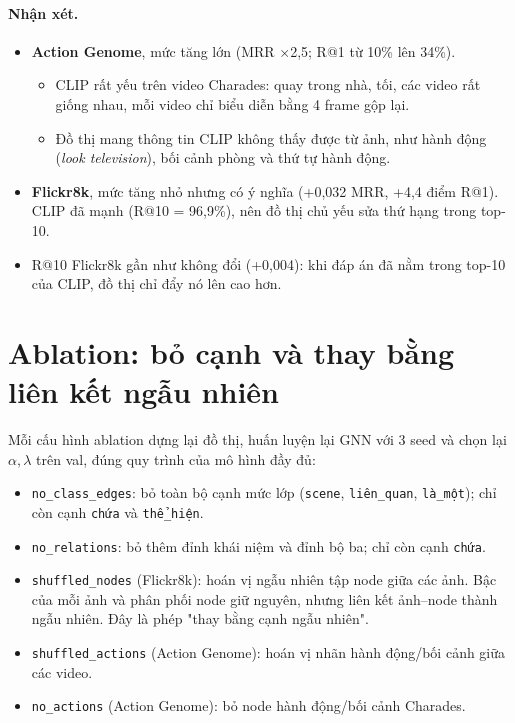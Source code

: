 \documentclass[11pt,a4paper]{article}
\begin{document}
\paragraph{Nhận xét.}
\begin{itemize}
  \item \textbf{Action Genome}, mức tăng lớn (MRR ×2,5; R@1 từ 10\% lên 34\%).
  \begin{itemize}
    \item CLIP rất yếu trên video Charades: quay trong nhà, tối, các video rất giống nhau, mỗi video chỉ biểu diễn bằng 4 frame gộp lại.
    \item Đồ thị mang thông tin CLIP không thấy được từ ảnh, như hành động (\textit{look television}), bối cảnh phòng và thứ tự hành động.
  \end{itemize}
  \item \textbf{Flickr8k}, mức tăng nhỏ nhưng có ý nghĩa (+0,032 MRR, +4,4 điểm R@1). CLIP đã mạnh (R@10 = 96,9\%), nên đồ thị chủ yếu sửa thứ hạng trong top-10.
  \item R@10 Flickr8k gần như không đổi (+0,004): khi đáp án đã nằm trong top-10 của CLIP, đồ thị chỉ đẩy nó lên cao hơn.
\end{itemize}

\section{Ablation: bỏ cạnh và thay bằng liên kết ngẫu nhiên}\label{sec:ablation}

Mỗi cấu hình ablation dựng lại đồ thị, huấn luyện lại GNN với 3 seed và chọn lại \(\alpha,\lambda\) trên val, đúng quy trình của mô hình đầy đủ:
\begin{itemize}
  \item \texttt{no\_class\_edges}: bỏ toàn bộ cạnh mức lớp (\texttt{scene}, \texttt{liên\_quan}, \texttt{là\_một}); chỉ còn cạnh \texttt{chứa} và \texttt{thể\_hiện}.
  \item \texttt{no\_relations}: bỏ thêm đỉnh khái niệm và đỉnh bộ ba; chỉ còn cạnh \texttt{chứa}.
  \item \texttt{shuffled\_nodes} (Flickr8k): hoán vị ngẫu nhiên tập node giữa các ảnh. Bậc của mỗi ảnh và phân phối node giữ nguyên, nhưng liên kết ảnh–node thành ngẫu nhiên. Đây là phép "thay bằng cạnh ngẫu nhiên".
  \item \texttt{shuffled\_actions} (Action Genome): hoán vị nhãn hành động/bối cảnh giữa các video.
  \item \texttt{no\_actions} (Action Genome): bỏ node hành động/bối cảnh Charades.
\end{itemize}
\end{document}
